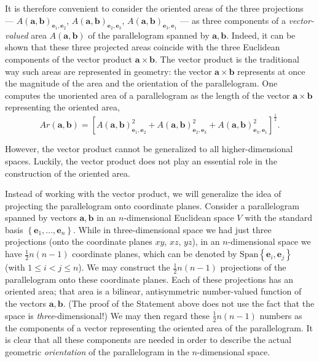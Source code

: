 It is therefore convenient to consider the oriented areas of the three
projections --- $A(\mathbf{a},\mathbf{b})_{\mathbf{e}_{1},\mathbf{e}_{2}}$,
$A(\mathbf{a},\mathbf{b})_{\mathbf{e}_{2},\mathbf{e}_{3}}$, $A(\mathbf{a},\mathbf{b})_{\mathbf{e}_{3},\mathbf{e}_{1}}$
--- as three components of a \emph{vector-valued} area $A(\mathbf{a},\mathbf{b})$
of the parallelogram spanned by $\mathbf{a},\mathbf{b}$. Indeed,
it can be shown that these three projected areas coincide with the
three Euclidean components of the vector product $\mathbf{a}\times\mathbf{b}$.
The vector product is the traditional way such areas are represented
in geometry: the vector $\mathbf{a}\times\mathbf{b}$ represents at
once the magnitude of the area and the orientation of the parallelogram.
One computes the unoriented area of a parallelogram as the length
of the vector $\mathbf{a}\times\mathbf{b}$ representing the oriented
area,\[
Ar(\mathbf{a},\mathbf{b})=\left[A(\mathbf{a},\mathbf{b})_{\mathbf{e}_{1},\mathbf{e}_{2}}^{2}+A(\mathbf{a},\mathbf{b})_{\mathbf{e}_{2},\mathbf{e}_{3}}^{2}+A(\mathbf{a},\mathbf{b})_{\mathbf{e}_{3},\mathbf{e}_{1}}^{2}\right]^{\frac{1}{2}}.\]


However, the vector product cannot be generalized to all higher-dimen\-sion\-al
spaces. Luckily, the vector product does not play an essential role
in the construction of the oriented area. 

Instead of working with the vector product, we will generalize the
idea of projecting the parallelogram onto coordinate planes. Consider
a parallelogram spanned by vectors $\mathbf{a},\mathbf{b}$ in an
$n$-dimen\-sion\-al Euclidean space $V$ with the standard basis
$\left\{ \mathbf{e}_{1},...,\mathbf{e}_{n}\right\} $. While in three-dimen\-sion\-al
space we had just three projections (onto the coordinate planes $xy$,
$xz$, $yz$), in an $n$-dimen\-sion\-al space we have $\frac{1}{2}n(n-1)$
coordinate planes, which can be denoted by $\text{Span}\left\{ \mathbf{e}_{i},\mathbf{e}_{j}\right\} $
(with $1\leq i<j\leq n$). We may construct the $\frac{1}{2}n(n-1)$
projections of the parallelogram onto these coordinate planes. Each
of these projections has an oriented area; that area is a bilinear,
antisymmetric number-valued function of the vectors $\mathbf{a},\mathbf{b}$.
(The proof of the Statement above does not use the fact that the space
is \emph{three}-dimen\-sion\-al!) We may then regard these $\frac{1}{2}n(n-1)$
numbers as the components of a vector representing the oriented area
of the parallelogram. It is clear that all these components are needed
in order to describe the actual geometric \emph{orientation} of the
parallelogram in the $n$-dimen\-sion\-al space.


